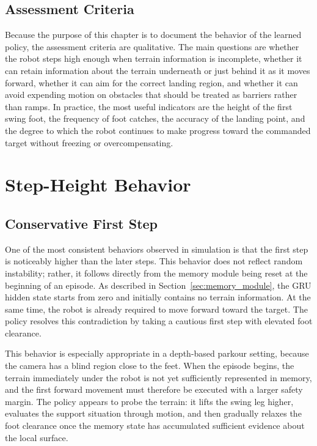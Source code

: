 \subsection{Assessment Criteria}
\label{sec:assessment_criteria}

Because the purpose of this chapter is to document the behavior of the learned policy, the assessment criteria are qualitative. The main questions are whether the robot steps high enough when terrain information is incomplete, whether it can retain information about the terrain underneath or just behind it as it moves forward, whether it can aim for the correct landing region, and whether it can avoid expending motion on obstacles that should be treated as barriers rather than ramps. In practice, the most useful indicators are the height of the first swing foot, the frequency of foot catches, the accuracy of the landing point, and the degree to which the robot continues to make progress toward the commanded target without freezing or overcompensating.

\section{Step-Height Behavior}
\label{sec:step_height_behavior}

\subsection{Conservative First Step}
\label{sec:conservative_first_step}

One of the most consistent behaviors observed in simulation is that the first step is noticeably higher than the later steps. This behavior does not reflect random instability; rather, it follows directly from the memory module being reset at the beginning of an episode. As described in Section~\ref{sec:memory_module}, the GRU hidden state starts from zero and initially contains no terrain information. At the same time, the robot is already required to move forward toward the target. The policy resolves this contradiction by taking a cautious first step with elevated foot clearance.

This behavior is especially appropriate in a depth-based parkour setting, because the camera has a blind region close to the feet. When the episode begins, the terrain immediately under the robot is not yet sufficiently represented in memory, and the first forward movement must therefore be executed with a larger safety margin. The policy appears to probe the terrain: it lifts the swing leg higher, evaluates the support situation through motion, and then gradually relaxes the foot clearance once the memory state has accumulated sufficient evidence about the local surface.


